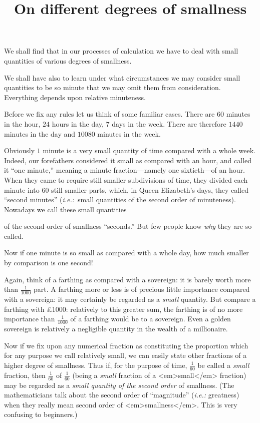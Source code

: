 \documentclass{ximera}
\title{On different degrees of smallness}
\begin{document}
\begin{abstract}
\end{abstract}
\maketitle

We shall find that in our processes of calculation we
have to deal with small quantities of various degrees
of smallness.

We shall have also to learn under what circumstances
we may consider small quantities to be so minute
that we may omit them from consideration. Everything
depends upon relative minuteness.

Before we fix any rules let us think of some
familiar cases. There are $60$ minutes in the hour,
$24$ hours in the day, $7$ days in the week. There are
therefore $1440$ minutes in the day and $10080$ minutes
in the week.

Obviously $1$ minute is a very small quantity of time compared with a
whole week. Indeed, our forefathers considered it small as compared
with an hour, and called it ``one minute,'' meaning a minute
fraction---namely one sixtieth---of an hour. When they came to require
still smaller subdivisions of time, they divided each minute into $60$
still smaller parts, which, in Queen Elizabeth's days, they called
``second minutes'' (\textit{i.e.:}~small quantities of the second order of
minuteness). Nowadays we call these small quantities

of the second order of smallness ``seconds.'' But few people know
\textit{why} they are so called.

Now if one minute is so small as compared with a whole day, how much
smaller by comparison is one second!

Again, think of a farthing as compared with a sovereign: it is barely
worth more than $\frac{1}{1000}$ part.  A farthing more or less is of
precious little importance compared with a sovereign: it may certainly
be regarded as a \textit{small} quantity. But compare a farthing with
£$1000$: relatively to this greater sum, the farthing is of no more
importance than $\frac{1}{1000}$ of a farthing would be to a
sovereign. Even a golden sovereign is relatively a negligible quantity
in the wealth of a millionaire.

Now if we fix upon any numerical fraction as constituting the
proportion which for any purpose we call relatively small, we can
easily state other fractions of a higher degree of smallness. Thus if,
for the purpose of time, $\frac{1}{60}$ be called a \textit{small}
fraction, then $\frac{1}{60}$ of $\frac{1}{60}$ (being a
\textit{small} fraction of a <em>small</em> fraction) may be regarded
as a \textit{small quantity of the second order} of smallness. (The
mathematicians talk about the second order of ``magnitude''
(\textit{i.e.:} greatness) when they really mean second order of
<em>smallness</em>.  This is very confusing to beginners.)
\end{document}
